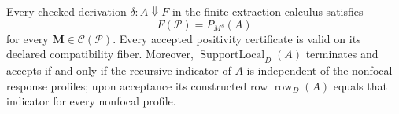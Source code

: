 Every checked derivation \(\delta:A\Downarrow F\) in the finite extraction calculus satisfies
\[
F(\mathcal P)=P_{M^s}(A)
\]
for every \(\mathbf M\in\mathcal C(\mathcal P)\).  Every accepted positivity certificate is valid on its declared compatibility fiber.  Moreover, \(\operatorname{SupportLocal}_D(A)\) terminates and accepts if and only if the recursive indicator of \(A\) is independent of the nonfocal response profiles; upon acceptance its constructed row \(\operatorname{row}_D(A)\) equals that indicator for every nonfocal profile.